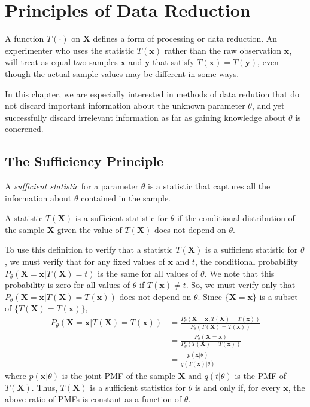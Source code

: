 \chapter{Principles of Data Reduction}

A function $T(\cdot)$ on $\mathbf{X}$ defines a form of processing or data reduction.
An experimenter who uses the statistic $T(\mathbf{x})$ rather than the raw observation $\mathbf{x}$, will treat as equal two samples $\mathbf{x}$ and $\mathbf{y}$ that satisfy $T(\mathbf{x}) = T(\mathbf{y})$, even though the actual sample values may be different in some ways.


In this chapter, we are especially interested in methods of data redution that do not discard important information about the unknown parameter $\theta$, and yet successfully discard irrelevant information as far as gaining knowledge about $\theta$ is concrened.


\section{The Sufficiency Principle}


 A \emph{sufficient statistic} for a parameter $\theta$ is a statistic that captures all the information about $\theta$ contained in the sample.

\begin{definition}
A statistic $T(\mathbf{X})$ is a sufficient statistic for $\theta$ if the conditional distribution of the sample $\mathbf{X}$ given the value of $T(\mathbf{X})$ does not depend on $\theta$.
\end{definition}

To use this definition to verify that a statistic $T(\mathbf{X})$ is a sufficient statistic for $\theta$, we must verify that for any fixed values of $\mathbf{x}$ and $t$, the conditional probability $P_{\theta} (\mathbf{X} = \mathbf{x} | T (\mathbf{X}) = t)$ is the same for all values of $\theta$.
We note that this probability is zero for all values of $\theta$ if $T(\mathbf{x}) \neq t$.
So, we must verify only that $P_{\theta} (\mathbf{X} = \mathbf{x} | T (\mathbf{X}) = T(\mathbf{x}))$ does not depend on $\theta$.
Since $\{ \mathbf{X} = \mathbf{x} \}$ is a subset of $\{ T(\mathbf{X}) = T(\mathbf{x}) \}$,
\begin{equation*}
\begin{split}
P_{\theta} (\mathbf{X} = \mathbf{x} | T (\mathbf{X}) = T(\mathbf{x}))
&= \frac{ P_{\theta} (\mathbf{X} = \mathbf{x}, T (\mathbf{X}) = T(\mathbf{x})) }{ P_{\theta} (T (\mathbf{X}) = T(\mathbf{x})) } \\
&= \frac{ P_{\theta} (\mathbf{X} = \mathbf{x}) }{ P_{\theta} (T (\mathbf{X}) = T(\mathbf{x})) } \\
&= \frac{ p (\mathbf{x} | \theta) }{ q(T (\mathbf{x}) | \theta) }
\end{split}
\end{equation*}
where $p(\mathbf{x}|\theta)$ is the joint PMF of the sample $\mathbf{X}$ and $q(t|\theta)$ is the PMF of $T(\mathbf{X})$.
Thus, $T(\mathbf{X})$ is a sufficient statistics for $\theta$ is and only if, for every $\mathbf{x}$, the above ratio of PMFs is constant as a function of $\theta$.

